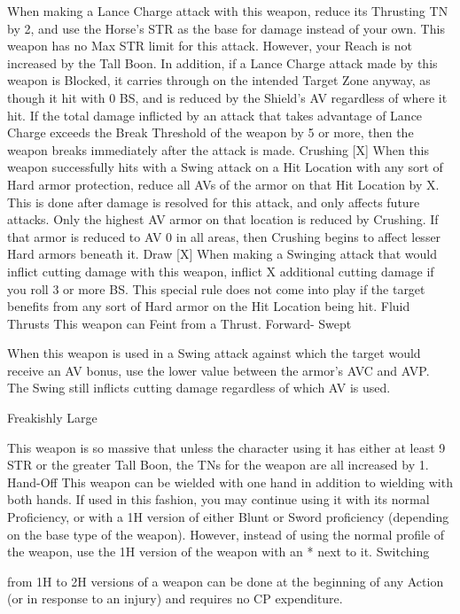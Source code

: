 \documentclass[oneside,11pt,english]{book}
\begin{document}
When making a Lance Charge attack with this weapon, reduce its Thrusting TN by 2, and use the 
Horse’s STR as the base for damage instead of your own. This weapon has no Max STR limit for 
this attack. However, your Reach is not increased by the Tall Boon. In addition, if a Lance Charge 
attack made by this weapon is Blocked, it carries through on the intended Target Zone anyway, as 
though it hit with 0 BS, and is reduced by the Shield’s AV regardless of where it hit. If the total 
damage inflicted by an attack that takes advantage of Lance Charge exceeds the Break Threshold 
of the weapon by 5 or more, then the weapon breaks immediately after the attack is made. 
Crushing [X] When this weapon successfully hits with a Swing attack on a Hit Location with any sort of Hard 
armor protection, reduce all AVs of the armor on that Hit Location by X. This is done after damage 
is resolved for this attack, and only affects future attacks. Only the highest AV armor on that 
location is reduced by Crushing. If that armor is reduced to AV 0 in all areas, then Crushing begins 
to affect lesser Hard armors beneath it. 
Draw [X] When making a Swinging attack that would inflict cutting damage with this weapon, inflict X 
additional cutting damage if you roll 3 or more BS. This special rule does not come into play if the 
target benefits from any sort of Hard armor on the Hit Location being hit. 
Fluid Thrusts This weapon can Feint from a Thrust. 
Forward-
Swept 

When this weapon is used in a Swing attack against which the target would receive an AV bonus, 
use the lower value between the armor’s AVC and AVP. The Swing still inflicts cutting damage 
regardless of which AV is used. 

Freakishly 
Large 

This weapon is so massive that unless the character using it has either at least 9 STR or the 
greater Tall Boon, the TNs for the weapon are all increased by 1. 
Hand-Off This weapon can be wielded with one hand in addition to wielding with both hands. If used in this 
fashion, you may continue using it with its normal Proficiency, or with a 1H version of either Blunt 
or Sword proficiency (depending on the base type of the weapon). However, instead of using the 
normal profile of the weapon, use the 1H version of the weapon with an * next to it. Switching 


from 1H to 2H versions of a weapon can be done at the beginning of any Action (or in response to 
an injury) and requires no CP expenditure. 
\end{document}

